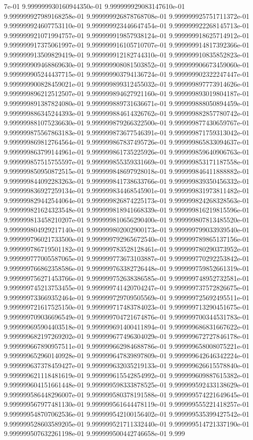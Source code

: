 7e-01	9.999999930160944350e-01	9.999999929083147610e-01	9.999999927989168258e-01	9.999999926878768708e-01	9.999999925751711372e-01	9.999999924607753110e-01	9.999999923446647454e-01	9.999999922268145713e-01	9.999999921071994757e-01	9.999999919857938124e-01	9.999999918625714912e-01	9.999999917375061997e-01	9.999999916105710707e-01	9.999999914817392366e-01	9.999999913509829419e-01	9.999999912182744310e-01	9.999999910835852823e-01	9.999999909468869630e-01	9.999999908081503852e-01	9.999999906673459060e-01	9.999999905244437715e-01	9.999999903794136724e-01	9.999999902322247447e-01	9.999999900828459021e-01	9.999999899312455032e-01	9.999999897773914626e-01	9.999999896212512507e-01	9.999999894627921160e-01	9.999999893019804187e-01	9.999999891387824080e-01	9.999999889731636671e-01	9.999999888050894459e-01	9.999999886345244393e-01	9.999999884614326762e-01	9.999999882857780742e-01	9.999999881075236630e-01	9.999999879266322500e-01	9.999999877430659767e-01	9.999999875567863183e-01	9.999999873677546391e-01	9.999999871759313042e-01	9.999999869812764564e-01	9.999999867837495726e-01	9.999999865833094637e-01	9.999999863799144961e-01	9.999999861735225926e-01	9.999999859640906763e-01	9.999999857515755597e-01	9.999999855359331669e-01	9.999999853171187558e-01	9.999999850950872515e-01	9.999999848697928018e-01	9.999999846411888882e-01	9.999999844092283263e-01	9.999999841738633766e-01	9.999999839350456332e-01	9.999999836927259134e-01	9.999999834468545901e-01	9.999999831973811482e-01	9.999999829442544064e-01	9.999999826874225173e-01	9.999999824268328563e-01	9.999999821624323548e-01	9.999999818941668339e-01	9.999999816219815596e-01	9.999999813458210207e-01	9.999999810656290400e-01	9.999999807813485520e-01	9.999999804929217140e-01	9.999999802002900173e-01	9.999999799033939540e-01	9.999999796021733500e-01	9.999999792965672540e-01	9.999999789865137156e-01	9.999999786719501182e-01	9.999999783528128461e-01	9.999999780290373952e-01	9.999999777005587065e-01	9.999999773673103887e-01	9.999999770292253842e-01	9.999999766862358586e-01	9.999999763382726448e-01	9.999999759852661319e-01	9.999999756271453766e-01	9.999999752638386585e-01	9.999999748952732581e-01	9.999999745213753455e-01	9.999999741420704247e-01	9.999999737572826675e-01	9.999999733669352464e-01	9.999999729709505569e-01	9.999999725692495511e-01	9.999999721617525150e-01	9.999999717483784023e-01	9.999999713290451675e-01	9.999999709036696549e-01	9.999999704721674876e-01	9.999999700344531783e-01	9.999999695904403518e-01	9.999999691400411894e-01	9.999999686831667622e-01	9.999999682197269202e-01	9.999999677496304029e-01	9.999999672727846178e-01	9.999999667890957511e-01	9.999999662984688786e-01	9.999999658008075221e-01	9.999999652960140928e-01	9.999999647839897809e-01	9.999999642646342224e-01	9.999999637378459427e-01	9.999999632035219133e-01	9.999999626615578840e-01	9.999999621118481619e-01	9.999999615542854992e-01	9.999999609887615382e-01	9.999999604151661448e-01	9.999999598333878525e-01	9.999999592433138629e-01	9.999999586448296007e-01	9.999999580378191588e-01	9.999999574221649645e-01	9.999999567977481130e-01	9.999999561644478119e-01	9.999999555221418257e-01	9.999999548707062536e-01	9.999999542100156402e-01	9.999999535399427542e-01	9.999999528603589205e-01	9.999999521711332440e-01	9.999999514721337190e-01	9.999999507632261198e-01	9.999999500442746658e-01	9.999